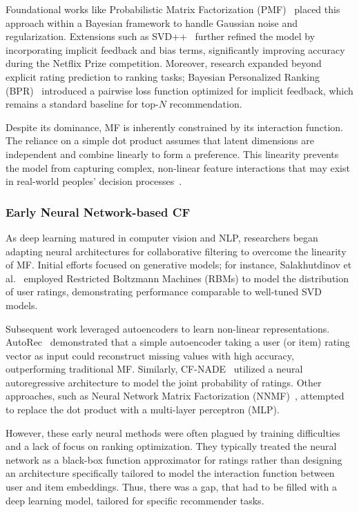 \documentclass[11pt]{article}
\begin{document}
Foundational works like Probabilistic Matrix Factorization (PMF)~\cite{mnih2007probabilistic} placed this approach within a Bayesian framework to handle Gaussian noise and regularization. Extensions such as SVD++~\cite{koren2008factorization} further refined the model by incorporating implicit feedback and bias terms, significantly improving accuracy during the Netflix Prize competition. Moreover, research expanded beyond explicit rating prediction to ranking tasks; Bayesian Personalized Ranking (BPR)~\cite{rendle2012bpr} introduced a pairwise loss function optimized for implicit feedback, which remains a standard baseline for top-$N$ recommendation.

Despite its dominance, MF is inherently constrained by its interaction function. The reliance on a simple dot product assumes that latent dimensions are independent and combine linearly to form a preference. This linearity prevents the model from capturing complex, non-linear feature interactions that may exist in real-world peoples' decision processes~\cite{he2017neural}. 

\subsubsection{Early Neural Network-based CF}

As deep learning matured in computer vision and NLP, researchers began adapting neural architectures for collaborative filtering to overcome the linearity of MF. Initial efforts focused on generative models; for instance, Salakhutdinov et al.~\cite{salakhutdinov2007restricted} employed Restricted Boltzmann Machines (RBMs) to model the distribution of user ratings, demonstrating performance comparable to well-tuned SVD models.

Subsequent work leveraged autoencoders to learn non-linear representations. AutoRec~\cite{sedhain2015autorec} demonstrated that a simple autoencoder taking a user (or item) rating vector as input could reconstruct missing values with high accuracy, outperforming traditional MF. Similarly, CF-NADE~\cite{zheng2016neural} utilized a neural autoregressive architecture to model the joint probability of ratings. Other approaches, such as Neural Network Matrix Factorization (NNMF)~\cite{dziugaite2015neural}, attempted to replace the dot product with a multi-layer perceptron (MLP).

However, these early neural methods were often plagued by training difficulties and a lack of focus on ranking optimization. They typically treated the neural network as a black-box function approximator for ratings rather than designing an architecture specifically tailored to model the interaction function between user and item embeddings. Thus, there was a gap, that had to be filled with a deep learning model, tailored for specific recommender tasks.
\end{document}

